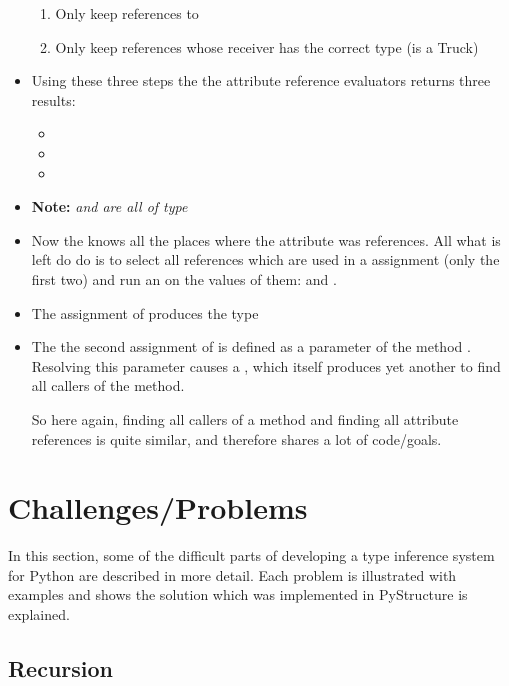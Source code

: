 \documentclass[12pt,halfparskip,DIV11,BCOR10mm]{scrreprt}
\begin{document}
\begin{itemize}
\begin{enumerate}
        \item Only keep references to 
        \item Only keep references whose receiver has the correct type (is a Truck)
    \end{enumerate}
    \item Using these three steps the the attribute reference evaluators returns three results:
    \begin{itemize}
        \item {}
        \item {}
        \item {}
    \end{itemize}
    \item \textbf{Note:} \emph{ and  are all of type }
    \item Now the  knows all the places where the attribute was references. All what is left do do is to select all references which are used in a assignment (only the first two) and run an  on the values of them:  and .
    \item The assignment of  produces the type 
    \item The the second assignment of  is defined as a parameter of the method . Resolving this parameter causes a , which itself produces yet another  to find all callers of the method.

So here again, finding all callers of a method and finding all attribute references is quite similar, and therefore shares a lot of code/goals.
    
\end{itemize}

\section{Challenges/Problems}

In this section, some of the difficult parts of developing a type inference system for Python are described in more detail. Each problem is illustrated with examples and shows the solution which was implemented in PyStructure is explained.

\subsection{Recursion}
\end{document}
